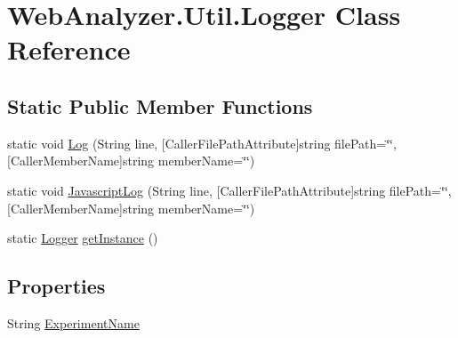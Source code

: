 \hypertarget{class_web_analyzer_1_1_util_1_1_logger}{}\section{Web\+Analyzer.\+Util.\+Logger Class Reference}
\label{class_web_analyzer_1_1_util_1_1_logger}
\subsection*{Static Public Member Functions}
\begin{DoxyCompactItemize}
\item 
static void \hyperlink{class_web_analyzer_1_1_util_1_1_logger_aa10868b15bb58d0b47f87e20f3826af4}{Log} (String line, \mbox{[}Caller\+File\+Path\+Attribute\mbox{]}string file\+Path=\char`\"{}\char`\"{}, \mbox{[}Caller\+Member\+Name\mbox{]}string member\+Name=\char`\"{}\char`\"{})
\item 
static void \hyperlink{class_web_analyzer_1_1_util_1_1_logger_a33483911cc1323468e23295904393b67}{Javascript\+Log} (String line, \mbox{[}Caller\+File\+Path\+Attribute\mbox{]}string file\+Path=\char`\"{}\char`\"{}, \mbox{[}Caller\+Member\+Name\mbox{]}string member\+Name=\char`\"{}\char`\"{})
\item 
static \hyperlink{class_web_analyzer_1_1_util_1_1_logger}{Logger} \hyperlink{class_web_analyzer_1_1_util_1_1_logger_a9fe9027e12a767e6cd0c3b9cf798dc81}{get\+Instance} ()
\end{DoxyCompactItemize}
\subsection*{Properties}
\begin{DoxyCompactItemize}
\item 
String \hyperlink{class_web_analyzer_1_1_util_1_1_logger_ae0228bcd61648d9b38e8aceaaf97024a}{Experiment\+Name}
\end{DoxyCompactItemize}
